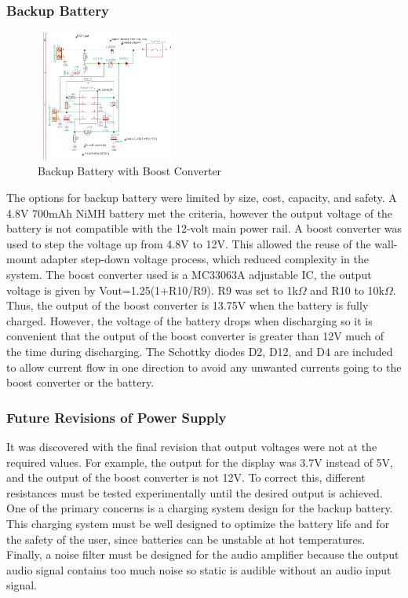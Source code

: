 \documentclass[journal,compsoc]{IEEEtran}
\begin{document}
\subsubsection{Backup Battery}

\begin{figure}[ht]	%
\centering
\includegraphics[width=0.4\textwidth]{Boost.png}
\caption{Backup Battery with Boost Converter}
\label{Pboost}
\end{figure}

The options for backup battery were limited by size, cost, capacity, and safety.  A 4.8V 700mAh NiMH battery met the criteria, however the output voltage of the battery is not compatible with the 12-volt main power rail.  A boost converter was used to step the voltage up from 4.8V to 12V.  This allowed the reuse of the wall-mount adapter step-down voltage process, which reduced complexity in the system.  The boost converter used is a MC33063A adjustable IC, the output voltage is given by Vout=1.25(1+R10/R9).  R9 was set to 1k$\Omega$ and R10 to 10k$\Omega$.  Thus, the output of the boost converter is 13.75V when the battery is fully charged.  However, the voltage of the battery drops when discharging so it is convenient that the output of the boost converter is greater than 12V much of the time during discharging.  The Schottky diodes D2, D12, and D4 are included to allow current flow in one direction to avoid any unwanted currents going to the boost converter or the battery.

\subsubsection{Future Revisions of Power Supply}

It was discovered with the final revision that output voltages were not at the required values.  For example, the output for the display was 3.7V instead of 5V, and the output of the boost converter is not 12V.  To correct this, different resistances must be tested experimentally until the desired output is achieved.  One of the primary concerns is a charging system design for the backup battery.  This charging system must be well designed to optimize the battery life and for the safety of the user, since batteries can be unstable at hot temperatures.  Finally, a noise filter must be designed for the audio amplifier because the output audio signal contains too much noise so static is audible without an audio input signal.
\end{document}
